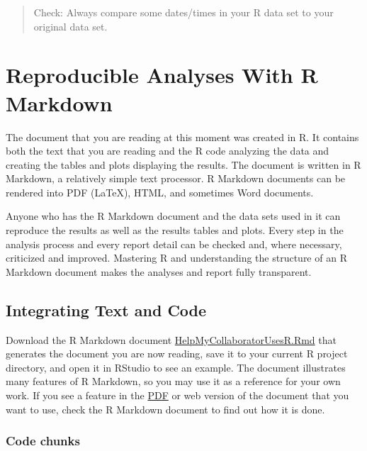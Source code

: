 \documentclass[doc,floatsintext]{apa6}
\begin{document}
\begin{quote}
Check: Always compare some dates/times in your R data set to your
original data set.
\end{quote}

\section{Reproducible Analyses With R Markdown}\label{rmarkdown}

The document that you are reading at this moment was created in R. It
contains both the text that you are reading and the R code analyzing the
data and creating the tables and plots displaying the results. The
document is written in R Markdown, a relatively simple text processor. R
Markdown documents can be rendered into PDF (LaTeX), HTML, and sometimes
Word documents.

Anyone who has the R Markdown document and the data sets used in it can
reproduce the results as well as the results tables and plots. Every
step in the analysis process and every report detail can be checked and,
where necessary, criticized and improved. Mastering R and understanding
the structure of an R Markdown document makes the analyses and report
fully transparent.

\subsection{Integrating Text and Code}\label{integratingtextcode}

Download the R Markdown document
\href{https://wdenooy.github.io/Switch2R/HelpMyCollaboratorUsesR.Rmd}{HelpMyCollaboratorUsesR.Rmd}
that generates the document you are now reading, save it to your current
R project directory, and open it in RStudio to see an example. The
document illustrates many features of R Markdown, so you may use it as a
reference for your own work. If you see a feature in the
\href{https://wdenooy.github.io/Switch2R/HelpMyCollaboratorUsesR.pdf}{PDF}
or web version of the document that you want to use, check the R
Markdown document to find out how it is done.

\subsubsection{Code chunks}\label{code-chunks}
\end{document}
